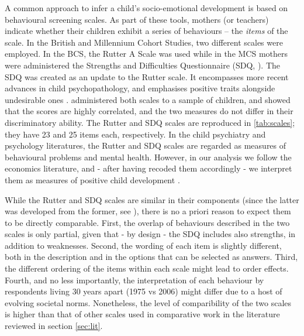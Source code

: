 A common approach to infer a child's socio-emotional development is based on behavioural screening scales. As part of these tools, mothers (or teachers) indicate whether their children exhibit a series of behaviours -- the \emph{items} of the scale. In the British and Millennium Cohort Studies, two different scales were employed. In the BCS, the Rutter A Scale was used \citep{Rutter1970} while in the MCS mothers were  administered the Strengths and Difficulties Questionnaire (SDQ, \citealp{Goodman1994,Goodman1997}). The SDQ was created as an update to the Rutter scale. It encompasses more recent advances in child psychopathology, and emphasises positive traits alongside undesirable ones \citep{Stone2010}. \citet{Goodman1997} administered both scales to a sample of children, and showed that the scores are highly correlated, and the two measures do not differ in their discriminatory ability. The Rutter and SDQ scales are reproduced in \autoref{tab:scales}; they have 23 and 25 items each, respectively. In the child psychiatry and psychology literatures, the Rutter and SDQ scales are regarded as measures of behavioural problems and mental health. However, in our analysis we follow the economics literature, and - after having recoded them accordingly - we interpret them as measures of positive child development \citep{Goodman2011}.

While the Rutter and SDQ scales are similar in their components (since the latter was developed from the former, see \citet{Goodman1994}), there is no a priori reason to expect them to be directly comparable. First, the overlap of behaviours described in the two scales is only partial, given that - by design - the SDQ includes also strengths, in addition to weaknesses. Second, the wording of each item is slightly different, both in the description and in the options that can be selected as answers. Third, the different ordering of the items within each scale might lead to order effects. Fourth, and no less importantly, the interpretation of each behaviour by respondents living 30 years apart (1975 vs 2006) might differ due to a host of evolving societal norms. Nonetheless, the level of comparibility of the two scales is higher than that of other scales used in comparative work in the literature reviewed in section \ref{sec:lit}.

